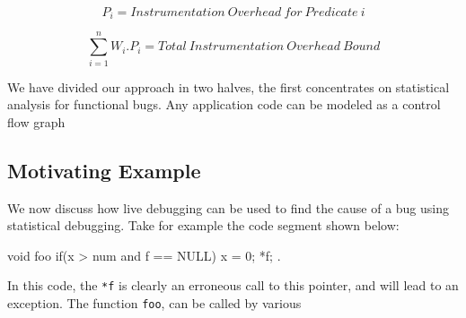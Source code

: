 \begin{equation}
    P_{i} = Instrumentation\ Overhead\ for\ Predicate\ i
\end{equation}

\begin{equation}
    \sum\limits_{i=1}^n W_{i}.P_{i} = Total\ Instrumentation\ Overhead\ Bound
\end{equation}

We have divided our approach in two halves, the first concentrates on statistical analysis for functional bugs.
Any application code can be modeled as a control flow graph 

\subsection{Motivating Example}
\label{sec:example}

We now discuss how live debugging can be used to find the cause of a bug using statistical debugging.
Take for example the code segment shown below:

\par
\begin{verbbox}[\footnotesize]
	void foo {
		if(x > num and f == NULL){
			x = 0;
			*f;
		}.
	}
\end{verbbox}
\fbox{\theverbbox}\par

In this code, the \texttt{*f} is clearly an erroneous call to this pointer, and will lead to an exception.
The function \texttt{foo}, can be called by various 
